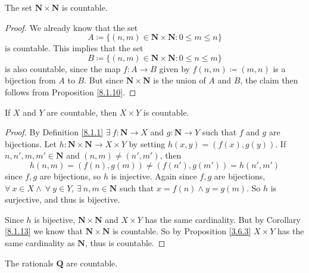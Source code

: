 \begin{corollary}\label{8.1.13}
    The set \(\mathbf{N} \times \mathbf{N}\) is countable.
\end{corollary}

\begin{proof}
    We already know that the set
    \[
        A \coloneqq \{(n, m) \in \mathbf{N} \times \mathbf{N} : 0 \leq m \leq n\}
    \]
    is countable.
    This implies that the set
    \[
        B \coloneqq \{(n, m) \in \mathbf{N} \times \mathbf{N} : 0 \leq n \leq m\}
    \]
    is also countable, since the map \(f : A \to B\) given by \(f(n, m) \coloneqq (m, n)\) is a bijection from \(A\) to \(B\).
    But since \(\mathbf{N} \times \mathbf{N}\) is the union of \(A\) and \(B\), the claim then follows from Proposition \ref{8.1.10}.
\end{proof}

\begin{corollary}\label{8.1.14}
    If \(X\) and \(Y\) are countable, then \(X \times Y\) is countable.
\end{corollary}

\begin{proof}
    By Definition \ref{8.1.1} \(\exists\ f : \mathbf{N} \to X\) and \(g : \mathbf{N} \to Y\) such that \(f\) and \(g\) are bijections.
    Let \(h : \mathbf{N} \times \mathbf{N} \to X \times Y\) by setting \(h(x, y) = (f(x), g(y))\).
    If \(n, n', m, m' \in \mathbf{N}\) and \((n, m) \neq (n', m')\), then
    \[
        h(n, m) = (f(n), g(m)) \neq (f(n'), g(m')) = h(n', m')
    \]
    since \(f, g\) are bijections, so \(h\) is injective.
    Again since \(f, g\) are bijections, \(\forall\ x \in X \land \ \forall\ y \in Y\), \(\exists\ n, m \in \mathbf{N}\) such that \(x = f(n) \land y = g(m)\).
    So \(h\) is surjective, and thus is bijective.

    Since \(h\) is bijective, \(\mathbf{N} \times \mathbf{N}\) and \(X \times Y\) has the same cardinality.
    But by Corollary \ref{8.1.13} we know that \(\mathbf{N} \times \mathbf{N}\) is countable.
    So by Proposition \ref{3.6.3} \(X \times Y\) has the same cardinality as \(\mathbf{N}\), thus is countable.
\end{proof}

\begin{corollary}\label{8.1.15}
    The rationals \(\mathbf{Q}\) are countable.
\end{corollary}

